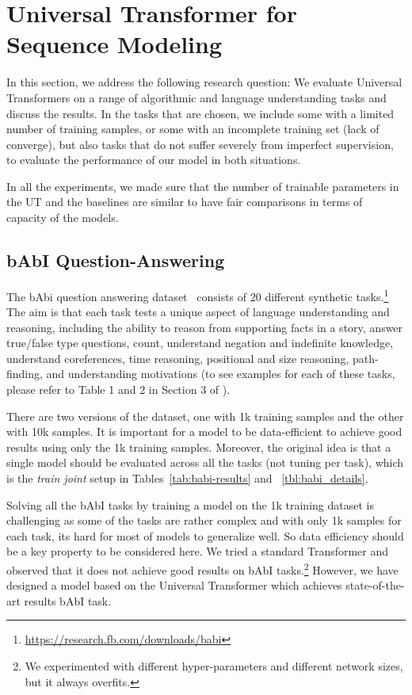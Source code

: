 \section{Universal Transformer for Sequence Modeling}
In this section, we address the following research question:
We evaluate Universal Transformers on a range of algorithmic and language understanding tasks and discuss the results. In the tasks that are chosen, we include some with a limited number of training samples, or some with an incomplete training set (lack of converge), but also tasks that do not suffer severely from imperfect supervision, to evaluate the performance of our model in both situations.  

In all the experiments, we made sure that the number of trainable parameters in the UT and the baselines are similar to have fair comparisons in terms of capacity of the models.

\subsection{bAbI Question-Answering}
The bAbi question answering dataset~\citep{weston2015towards} consists of 20 different synthetic tasks.\footnote{\url{https://research.fb.com/downloads/babi}} The aim is that each task tests a unique aspect of language understanding and reasoning, including the ability to reason from supporting facts in a story, answer true/false type questions, count, understand negation and indefinite knowledge, understand coreferences, time reasoning, positional and size reasoning, path-finding, and understanding motivations (to see examples for each of these tasks, please refer to Table 1 and 2 in Section 3 of \citep{weston2015towards}).


There are two versions of the dataset, one with 1k training samples and the other with 10k samples. It is important for a model to be data-efficient to achieve good results using only the 1k training samples. Moreover, the original idea is that a single model should be evaluated across all the tasks (not tuning per task), which is the \emph{train joint} setup in Tables~\ref{tab:babi-results} and ~\ref{tbl:babi_details}.

Solving all the bAbI tasks by training a model on the 1k training dataset is challenging as some of the tasks are rather complex and with only 1k samples for each task, its hard for most of models to generalize well. So data efficiency should be a key property to be considered here. 
We tried a standard Transformer and observed that it does not achieve good results on bAbI tasks.\footnote{We experimented with different hyper-parameters and different network sizes, but it always overfits.} However, we have designed a model based on the Universal Transformer which achieves state-of-the-art results bAbI task. 

